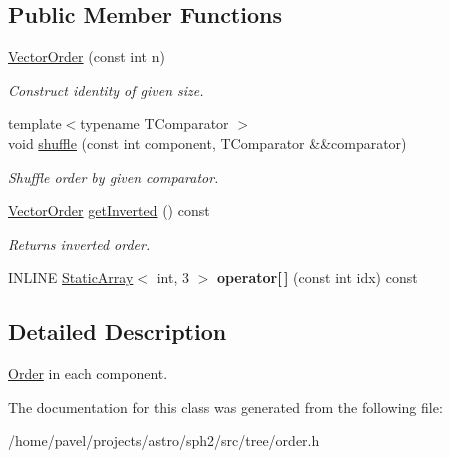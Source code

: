 \subsection*{Public Member Functions}
\begin{DoxyCompactItemize}
\item 
\hypertarget{classVectorOrder_ae0075bbfd72ca72134a19964ec95f5b2}{}\label{classVectorOrder_ae0075bbfd72ca72134a19964ec95f5b2} 
\hyperlink{classVectorOrder_ae0075bbfd72ca72134a19964ec95f5b2}{Vector\+Order} (const int n)
\begin{DoxyCompactList}\small\item\em Construct identity of given size. \end{DoxyCompactList}\item 
\hypertarget{classVectorOrder_a74b5fb650d7039b678b84da7c3d9bf69}{}\label{classVectorOrder_a74b5fb650d7039b678b84da7c3d9bf69} 
{\footnotesize template$<$typename T\+Comparator $>$ }\\void \hyperlink{classVectorOrder_a74b5fb650d7039b678b84da7c3d9bf69}{shuffle} (const int component, T\+Comparator \&\&comparator)
\begin{DoxyCompactList}\small\item\em Shuffle order by given comparator. \end{DoxyCompactList}\item 
\hypertarget{classVectorOrder_a9df165e4e5093af625298da24598e36a}{}\label{classVectorOrder_a9df165e4e5093af625298da24598e36a} 
\hyperlink{classVectorOrder}{Vector\+Order} \hyperlink{classVectorOrder_a9df165e4e5093af625298da24598e36a}{get\+Inverted} () const
\begin{DoxyCompactList}\small\item\em Returns inverted order. \end{DoxyCompactList}\item 
\hypertarget{classVectorOrder_af27fdaf2aab13d74c2e1603aac526df7}{}\label{classVectorOrder_af27fdaf2aab13d74c2e1603aac526df7} 
I\+N\+L\+I\+NE \hyperlink{classStaticArray}{Static\+Array}$<$ int, 3 $>$ {\bfseries operator\mbox{[}$\,$\mbox{]}} (const int idx) const
\end{DoxyCompactItemize}


\subsection{Detailed Description}
\hyperlink{classOrder}{Order} in each component. 

The documentation for this class was generated from the following file\+:\begin{DoxyCompactItemize}
\item 
/home/pavel/projects/astro/sph2/src/tree/order.\+h\end{DoxyCompactItemize}
